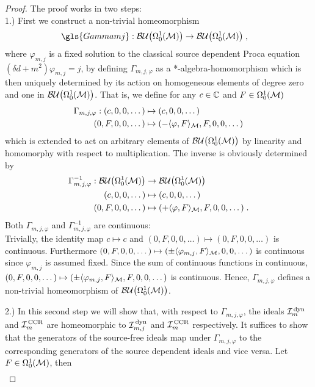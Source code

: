 \begin{proof}
	The proof works in two steps:\\
	1.) First we construct a non-trivial homeomorphism
	\begin{align}
	\gls{Gammamj} : \BUOmega &\to \BUOmega \formspace,
	\end{align}
	where $\varphi_{m,j}$ is a fixed solution to the classical source dependent Proca equation $(\delta d +m^2) \varphi_{m,j}= j$,
	by defining $\Gamma_{m,j,\varphi}$ as a *-algebra-homomorphism which is then uniquely determined by its action on homogeneous elements of degree zero and one in ${\mathcal{BU}\big(\Omega^1_0(\mathcal{M})\big)}$. That is, we define for any $c \in \mathbb{C}$ and $F \in \Omega^1_0(\mathcal{M})$
			\begin{align}
			\Gamma_{m,j,\varphi} :
			(c,0,0,\dots) &\mapsto (c,0,0,\dots) \\
			(0,F,0,0,\dots) &\mapsto (-\langle \varphi , F \rangle_{\mathcal{M}} , F , 0,0,\dots) \notag
			\end{align}
	which is extended to act on arbitrary elements of ${\mathcal{BU}\big(\Omega^1_0(\mathcal{M})\big)}$ by linearity and homomorphy with respect to multiplication.
	The inverse is obviously determined by
	\begin{align}
	\Gamma_{m,j,\varphi}^{-1} : {\mathcal{BU}\big(\Omega^1_0(\mathcal{M})\big)} &\to {\mathcal{BU}\big(\Omega^1_0(\ensuremath{\mathcal{M}})\big)} \\
	(c,0,0,\dots) &\mapsto (c,0,0,\dots) \notag\\
	(0,F,0,0,\dots) &\mapsto (+\langle \varphi , F \rangle_{\mathcal{M}} , F , 0,0,\dots) \;.\notag
	\end{align}
	Both $\Gamma_{m,j,\varphi}$ and $\Gamma_{m,j,\varphi}^{-1}$ are continuous:\\
	Trivially, the identity map $c \mapsto c$ and $(0,F,0,0,\dots) \mapsto (0,F,0,0,\dots)$ is continuous. Furthermore $(0,F,0,0,\dots) \mapsto (\pm \langle \varphi_{m,j}, F \rangle_{\mathcal{M}} , 0,0,\dots )$ is continuous since $\varphi_{m,j}$ is assumed fixed. Since the sum of continuous functions in continuous, $(0,F,0,0,\dots) \mapsto (\pm \langle \varphi_{m,j},F \rangle_{\mathcal{M}}, F, 0,0,\dots)$ is continuous. Hence, $\Gamma_{m,j,\varphi}$ defines a non-trivial homeomorphism of ${\mathcal{BU}\big(\Omega^1_0(\mathcal{M})\big)}$.\par
	2.) In this second step we will show that, with respect to $\Gamma_{m,j,\varphi}$, the ideals $\mathcal{I}_m^\text{\,dyn}$ and $\mathcal{I}_m^\text{\,CCR}$ are homeomorphic to $\mathcal{I}_{m,j}^\text{\,dyn}$ and $\mathcal{I}_m^\text{\,CCR}$ respectively.
	It suffices to show that the generators of the source-free ideals map under $\Gamma_{m,j,\varphi}$ to the corresponding generators of the source dependent ideals and vice versa. Let $F\in \Omega^1_0(\mathcal{M})$, then
	\begin{align}

\end{align}
\end{proof}
